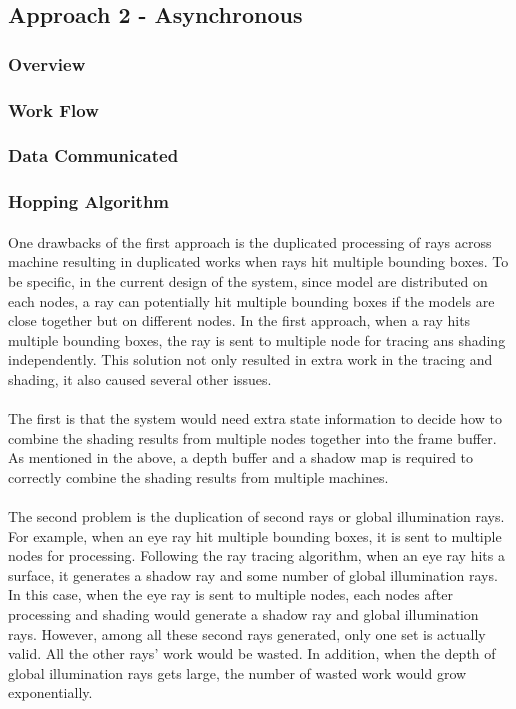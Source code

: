 \documentclass[a4paper, oneside, 10pt]{article}
\begin{document}
\subsection{Approach 2 - Asynchronous}
\subsubsection{Overview}
\subsubsection{Work Flow}
\subsubsection{Data Communicated}
\subsubsection{Hopping Algorithm}
\paragraph{} One drawbacks of the first approach is the duplicated processing of rays across machine resulting in duplicated works when rays hit multiple bounding boxes. To be specific, in the current design of the system, since model are distributed on each nodes, a ray can potentially hit multiple bounding boxes if the models are close together but on different nodes.  In the first approach, when a ray hits multiple bounding boxes, the ray is sent to multiple node for tracing ans shading independently. This solution not only resulted in extra work in the tracing and shading, it also caused several other issues.
\paragraph{} The first is that the system would need extra state information to decide how to combine the shading results from multiple nodes together into the frame buffer. As mentioned in the above, a depth buffer and a shadow map is required to correctly combine the shading results from multiple machines. 
\paragraph{} The second problem is the duplication of second rays or global illumination rays. For example, when an eye ray hit multiple bounding boxes, it is sent to multiple nodes for processing. Following the ray tracing algorithm, when an eye ray hits a surface, it generates a shadow ray and some number of global illumination rays. In this case, when the eye ray is sent to multiple nodes, each nodes after processing and shading would generate a shadow ray and global illumination rays. However, among all these second rays generated, only one set is actually valid. All the other rays' work would be wasted. In addition, when the depth of global illumination rays gets large, the number of wasted work would grow exponentially. 
\end{document}
